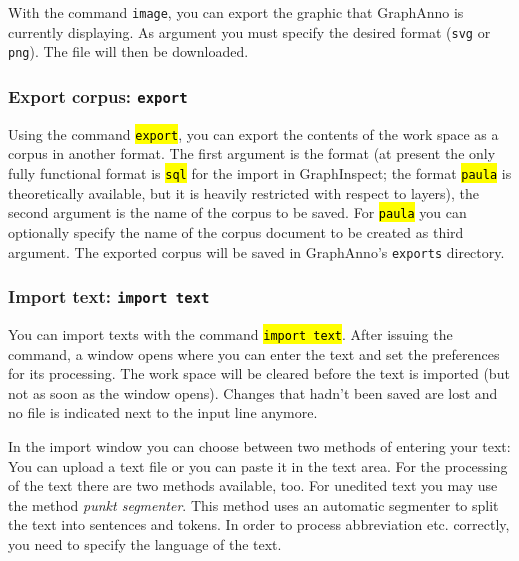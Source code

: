 \documentclass[12pt]{scrartcl}
\newcommand{\code}[1]{\hl{\texttt{#1}}}
\begin{document}
With the command \texttt{image}, you can export the graphic that GraphAnno is currently displaying.
As argument you must specify the desired format (\texttt{svg} or \texttt{png}).
The file will then be downloaded.


\subsubsection{Export corpus: \texttt{export}}\label{befehl-export}

Using the command \code{export}, you can export the contents of the work space as a corpus in another format.
The first argument is the format (at present the only fully functional format is \code{sql} for the import in GraphInspect; the format \code{paula} is theoretically available, but it is heavily restricted with respect to layers), the second argument is the name of the corpus to be saved.
For \code{paula} you can optionally specify the name of the corpus document to be created as third argument.
The exported corpus will be saved in GraphAnno’s \texttt{exports} directory.


\subsubsection{Import text: \texttt{import text}}\label{befehl-import}

You can import texts with the command \code{import text}. After issuing the command, a window opens where you can enter the text and set the preferences for its processing.
The work space will be cleared before the text is imported (but not as soon as the window opens).
Changes that hadn’t been saved are lost and no file is indicated next to the input line anymore.

In the import window you can choose between two methods of entering your text:
You can upload a text file or you can paste it in the text area.
For the processing of the text there are two methods available, too.
For unedited text you may use the method \textit{punkt segmenter}.
This method uses an automatic segmenter to split the text into sentences and tokens.
In order to process abbreviation etc. correctly, you need to specify the language of the text.
\end{document}
